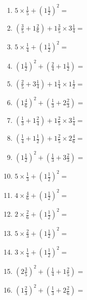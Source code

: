 \documentclass[12pt]{article}
\begin{document}
\begin{enumerate}
\item \large $ 5 \times \frac{1}{5} + (1 \frac{1}{2})^2 = $ \vspace{1.8cm}
\item \large $ (\frac{3}{5} + 1 \frac{2}{6}) + 1 \frac{3}{5} \times 3 \frac{1}{4} = $ \vspace{1.8cm}
\item \large $ 5 \times \frac{1}{4} + (1 \frac{1}{2})^2 = $ \vspace{1.8cm}
\item \large $ (1 \frac{1}{2})^2 + (\frac{2}{4} + 1 \frac{1}{2}) = $ \vspace{1.8cm}
\item \large $ (\frac{2}{5} + 3 \frac{1}{4}) + 1 \frac{1}{4} \times 1 \frac{1}{2} = $ \vspace{1.8cm}
\item \large $ (1 \frac{4}{6})^2 + (\frac{1}{3} + 2 \frac{2}{3}) = $ \vspace{1.8cm}
\item \large $ (\frac{1}{3} + 1 \frac{2}{4}) + 1 \frac{2}{5} \times 3 \frac{1}{4} = $ \vspace{1.8cm}
\item \large $ (\frac{1}{4} + 1 \frac{1}{2}) + 1 \frac{2}{5} \times 2 \frac{4}{6} = $ \vspace{1.8cm}
\item \large $ (1 \frac{1}{2})^2 + (\frac{1}{3} + 3 \frac{2}{3}) = $ \vspace{1.8cm}
\item \large $ 5 \times \frac{1}{3} + (1 \frac{1}{2})^2 = $ \vspace{1.8cm}
\newpage
\item \large $ 4 \times \frac{4}{6} + (1 \frac{1}{2})^2 = $ \vspace{1.8cm}
\item \large $ 2 \times \frac{2}{6} + (1 \frac{1}{2})^2 = $ \vspace{1.8cm}
\item \large $ 5 \times \frac{2}{3} + (1 \frac{1}{2})^2 = $ \vspace{1.8cm}
\item \large $ 3 \times \frac{1}{4} + (1 \frac{1}{2})^2 = $ \vspace{1.8cm}
\item \large $ (2 \frac{3}{5})^2 + (\frac{1}{4} + 1 \frac{2}{5}) = $ \vspace{1.8cm}
\item \large $ (1 \frac{2}{3})^2 + (\frac{1}{3} + 2 \frac{2}{6}) = $ \vspace{1.8cm}

\end{enumerate}
\end{document}
